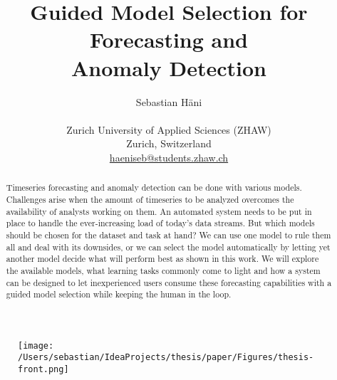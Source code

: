 \documentclass[smallabstract,smallcaptions]{dccpaper}
\begin{document}
\title
{\large
\textbf{Guided Model Selection for Forecasting and \\ Anomaly Detection}
}


\author{%
Sebastian Häni\\[0.5em]
{\small\begin{minipage}{\linewidth}\begin{center}
\begin{tabular}{ccc}
Zurich University of Applied Sciences (ZHAW)\\
Zurich, Switzerland\\
\url{haeniseb@students.zhaw.ch}
\end{tabular}
\end{center}\end{minipage}}
}

\maketitle
\thispagestyle{empty}



\begin{figure}[h]
\centerline{\texttt{[image: /Users/sebastian/IdeaProjects/thesis/paper/Figures/thesis-front.png]}}
\end{figure}


\vspace{5em}

\begin{abstract}
Timeseries forecasting and anomaly detection can be done with various models. Challenges arise when the amount of timeseries to be analyzed overcomes the availability of analysts working on them. An automated system needs to be put in place to handle the ever-increasing load of today's data streams. But which models should be chosen for the dataset and task at hand? We can use one model to rule them all and deal with its downsides, or we can select the model automatically by letting yet another model decide what will perform best as shown in this work. We will explore the available models, what learning tasks commonly come to light and how a system can be designed to let inexperienced users consume these forecasting capabilities with a guided model selection while keeping the human in the loop.
\end{abstract}

\newpage
\tableofcontents
\newpage












\end{document}
